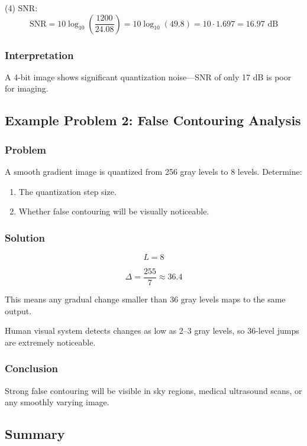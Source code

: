 \documentclass{AnantDocumentation}
\begin{document}
(4) SNR:
\[
\text{SNR} = 10 \log_{10} \left(\frac{1200}{24.08}\right)
= 10\log_{10}(49.8)
= 10 \cdot 1.697 = 16.97 \text{ dB}
\]

\subsubsection*{Interpretation}

A 4-bit image shows significant quantization noise—SNR of only 17 dB is poor for imaging.

\subsection{Example Problem 2: False Contouring Analysis}

\subsubsection*{Problem}

A smooth gradient image is quantized from 256 gray levels to 8 levels.  
Determine:

\begin{enumerate}
\item The quantization step size.
\item Whether false contouring will be visually noticeable.
\end{enumerate}

\subsubsection*{Solution}

\[
L = 8
\]

\[
\Delta = \frac{255}{7} \approx 36.4
\]

This means any gradual change smaller than 36 gray levels maps to the same output.

Human visual system detects changes as low as 2–3 gray levels, so 36-level jumps are extremely noticeable.

\subsubsection*{Conclusion}

Strong false contouring will be visible in sky regions, medical ultrasound scans, or any smoothly varying image.

\subsection{Summary}
\end{document}
